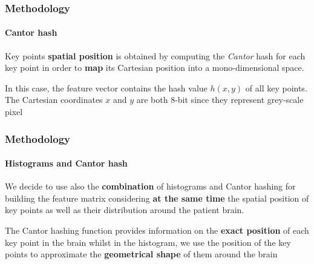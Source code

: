 \begin{frame}
	\frametitle{Methodology}
	\framesubtitle{Cantor hash}
	
	\Large
	
	\vspace{0.3cm}
	
	Key points \textbf{spatial position} is obtained by computing the \emph{Cantor} hash for each key
	point in order to \textbf{map} its Cartesian position into a mono-dimensional space.
	
	\vspace{0.2cm}
	
	In this case, the feature vector contains the hash value $ h(x,y) $ of all key points. The
	Cartesian coordinates $ x $ and $ y $ are both 8-bit since they represent grey-scale pixel
	
	\begin{center}
	\end{center}
\end{frame}

\begin{frame}
	\frametitle{Methodology}
	\framesubtitle{Histograms and Cantor hash}
	
	\Large
	
	\vspace{0.3cm}
	
	We decide to use also the \textbf{combination} of histograms and Cantor hashing for building the
	feature matrix considering \textbf{at the same time} the spatial position of key points as well as
	their distribution around the patient brain.
	
	\vspace{0.3cm}
	
	The Cantor hashing function provides information on the \textbf{exact position} of each key point
	in the brain whilst in the histogram, we use the position of the key points to approximate the
	\textbf{geometrical shape} of them around the brain
\end{frame}


